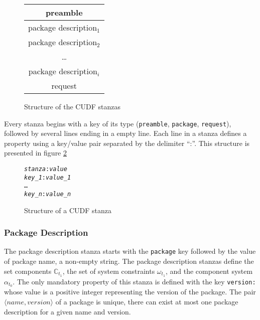 \begin{figure}[htp]
\centering
\begin{tabular}{|c|}
\hline preamble \\ \hline
\hline package description$_{1}$ \\ \hline
\hline package description$_{2}$ \\ \hline
 \multicolumn{1}{c}{\ldots}  \\ 
\hline package description$_{i}$\\ \hline
\hline request\\ \hline
\end{tabular}
\caption{Structure of the CUDF stanzas}
\label{formal:cudfstruct}
\end{figure}

Every stanza begins with a key of its type (\verb+preamble+, \verb+package+, \verb+request+), followed by several lines ending in a empty line.
Each line in a stanza defines a property using a key/value pair separated by the delimiter ``:''.
This structure is presented in figure \ref{formal.cudfstanza}

\begin{figure}[htp] 
\begin{center}
\begin{alltt}
\textit{stanza}: \textit{value}
\textit{key_1}: \textit{value_1}
\ldots
\textit{key_n}: \textit{value_n}
\end{alltt}
  \caption{Structure of a CUDF stanza}
  \label{formal.cudfstanza}
\end{center}
\end{figure}

\subsubsection{Package Description}
The package description stanza starts with the \verb+package+ key followed by the value of package name, a non-empty string.
The package description stanzas define the set components $\mathbb{C}_{t_1}$, the set of system constraints $\omega_{t_1}$, and the component system $\alpha_{t_{0}}$.
The only mandatory property of this stanza is defined with the key \verb+version:+ whose value is a positive integer representing the version of the package.
The pair $\langle name, version \rangle$ of a package is unique, there can exist at most one package description for a given name and version.


